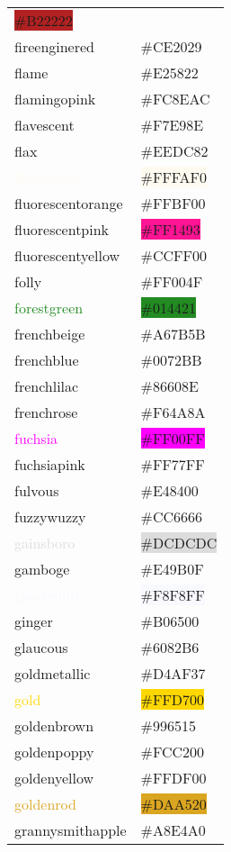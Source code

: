 \documentclass[
]{article}
\begin{document}
\begin{longtable}[]{@{}ll@{}}
\colorbox{firebrick}{\#B22222}\tabularnewline
\textcolor{fireenginered}{fireenginered} &
\colorbox{fireenginered}{\#CE2029}\tabularnewline
\textcolor{flame}{flame} & \colorbox{flame}{\#E25822}\tabularnewline
\textcolor{flamingopink}{flamingopink} &
\colorbox{flamingopink}{\#FC8EAC}\tabularnewline
\textcolor{flavescent}{flavescent} &
\colorbox{flavescent}{\#F7E98E}\tabularnewline
\textcolor{flax}{flax} & \colorbox{flax}{\#EEDC82}\tabularnewline
\textcolor{floralwhite}{floralwhite} &
\colorbox{floralwhite}{\#FFFAF0}\tabularnewline
\textcolor{fluorescentorange}{fluorescentorange} &
\colorbox{amber}{\#FFBF00}\tabularnewline
\textcolor{fluorescentpink}{fluorescentpink} &
\colorbox{deeppink}{\#FF1493}\tabularnewline
\textcolor{fluorescentyellow}{fluorescentyellow} &
\colorbox{electriclime}{\#CCFF00}\tabularnewline
\textcolor{folly}{folly} & \colorbox{folly}{\#FF004F}\tabularnewline
\textcolor{forestgreen}{forestgreen} &
\colorbox{forestgreen}{\#014421}\tabularnewline
\textcolor{frenchbeige}{frenchbeige} &
\colorbox{frenchbeige}{\#A67B5B}\tabularnewline
\textcolor{frenchblue}{frenchblue} &
\colorbox{frenchblue}{\#0072BB}\tabularnewline
\textcolor{frenchlilac}{frenchlilac} &
\colorbox{frenchlilac}{\#86608E}\tabularnewline
\textcolor{frenchrose}{frenchrose} &
\colorbox{frenchrose}{\#F64A8A}\tabularnewline
\textcolor{fuchsia}{fuchsia} &
\colorbox{fuchsia}{\#FF00FF}\tabularnewline
\textcolor{fuchsiapink}{fuchsiapink} &
\colorbox{fuchsiapink}{\#FF77FF}\tabularnewline
\textcolor{fulvous}{fulvous} &
\colorbox{fulvous}{\#E48400}\tabularnewline
\textcolor{fuzzywuzzy}{fuzzywuzzy} &
\colorbox{fuzzywuzzy}{\#CC6666}\tabularnewline
\textcolor{gainsboro}{gainsboro} &
\colorbox{gainsboro}{\#DCDCDC}\tabularnewline
\textcolor{gamboge}{gamboge} &
\colorbox{gamboge}{\#E49B0F}\tabularnewline
\textcolor{ghostwhite}{ghostwhite} &
\colorbox{ghostwhite}{\#F8F8FF}\tabularnewline
\textcolor{ginger}{ginger} & \colorbox{ginger}{\#B06500}\tabularnewline
\textcolor{glaucous}{glaucous} &
\colorbox{glaucous}{\#6082B6}\tabularnewline
\textcolor{goldmetallic}{goldmetallic} &
\colorbox{goldmetallic}{\#D4AF37}\tabularnewline
\textcolor{gold}{gold} & \colorbox{gold}{\#FFD700}\tabularnewline
\textcolor{goldenbrown}{goldenbrown} &
\colorbox{goldenbrown}{\#996515}\tabularnewline
\textcolor{goldenpoppy}{goldenpoppy} &
\colorbox{goldenpoppy}{\#FCC200}\tabularnewline
\textcolor{goldenyellow}{goldenyellow} &
\colorbox{goldenyellow}{\#FFDF00}\tabularnewline
\textcolor{goldenrod}{goldenrod} &
\colorbox{goldenrod}{\#DAA520}\tabularnewline
\textcolor{grannysmithapple}{grannysmithapple} &
\colorbox{grannysmithapple}{\#A8E4A0}\tabularnewline

\end{longtable}
\end{document}
